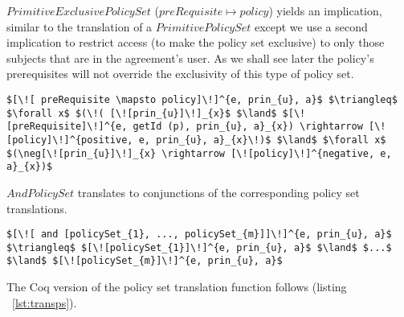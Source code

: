 $PrimitiveExclusivePolicySet$ ($preRequisite \mapsto policy$) yields an implication, similar to the translation of a $PrimitivePolicySet$ except we use a second implication to restrict access (to make the policy set exclusive) to only those subjects that are in the agreement's user. As we shall see later the policy's prerequisites will not override the exclusivity of this type of policy set.

\lstset{mathescape, language=AST}  
\begin{lstlisting}[frame=single, caption={Policy Set Translation {$\colon$} PrimitiveExclusivePolicySet},label={lst:transpolicyformulaPrimitiveExclusivePolicySet}]
$[\![ preRequisite \mapsto policy]\!]^{e, prin_{u}, a}$ $\triangleq$ $\forall x$ $(\!( [\![prin_{u}]\!]_{x}$ $\land$ $[\![preRequisite]\!]^{e, getId (p), prin_{u}, a}_{x}) \rightarrow [\![policy]\!]^{positive, e, prin_{u}, a}_{x}\!)$ $\land$ $\forall x$ $(\neg[\![prin_{u}]\!]_{x} \rightarrow [\![policy]\!]^{negative, e, a}_{x})$
\end{lstlisting}

$AndPolicySet$ translates to conjunctions of the corresponding policy set translations. 

\lstset{mathescape, language=AST}  
\begin{lstlisting}[frame=single, caption={Policy Set Translation {$\colon$} AndPolicySet},label={lst:transpolicyformulaAndPolicySet}]
$[\![ and [policySet_{1}, ..., policySet_{m}]]\!]^{e, prin_{u}, a}$ $\triangleq$ $[\![policySet_{1}]\!]^{e, prin_{u}, a}$ $\land$ $...$ $\land$ $[\![policySet_{m}]\!]^{e, prin_{u}, a}$

\end{lstlisting}

The Coq version of the policy set translation function follows (listing ~\ref{lst:transps}).

